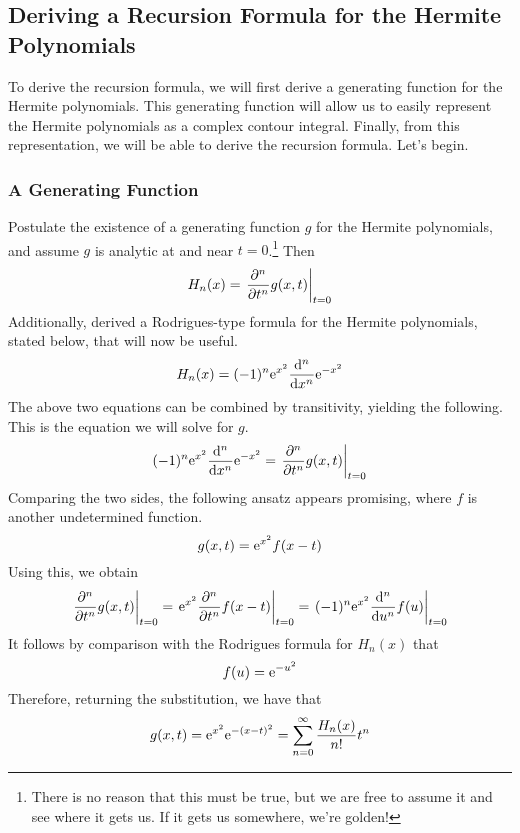 \documentclass[titlepage]{article}
\numberwithin{equation}{section}
\begin{document}
\subsection{Deriving a Recursion Formula for the Hermite Polynomials}
To derive the recursion formula, we will first derive a generating function for the Hermite polynomials. This generating function will allow us to easily represent the Hermite polynomials as a complex contour integral. Finally, from this representation, we will be able to derive the recursion formula. Let's begin.

\subsubsection{A Generating Function}
Postulate the existence of a generating function $g$ for the Hermite polynomials, and assume $g$ is analytic at and near $t=0$.\footnote{There is no reason that this must be true, but we are free to assume it and see where it gets us. If it gets us somewhere, we're golden!} Then
\begin{equation*}
    H_n(x) = \eval{\pdv[n]{t}g(x,t)}_{t=0}
\end{equation*}
Additionally, \textcite{bib:Seaborn} derived a Rodrigues-type formula for the Hermite polynomials, stated below, that will now be useful.
\begin{equation*}
    H_n(x) = (-1)^n\e[x^2]\dv[n]{x}\e[-x^2]
\end{equation*}
The above two equations can be combined by transitivity, yielding the following. This is the equation we will solve for $g$.
\begin{equation*}
    (-1)^n\e[x^2]\dv[n]{x}\e[-x^2] = \eval{\pdv[n]{t}g(x,t)}_{t=0}
\end{equation*}
Comparing the two sides, the following ansatz appears promising, where $f$ is another undetermined function.
\begin{equation*}
    g(x,t) = \e[x^2]f(x-t)
\end{equation*}
Using this, we obtain
\begin{equation*}
    \eval{\pdv[n]{t}g(x,t)}_{t=0} = \eval{\e[x^2]\pdv[n]{t}f(x-t)}_{t=0}
    = \eval{(-1)^n\e[x^2]\dv[n]{u}f(u)}_{t=0}
\end{equation*}
It follows by comparison with the Rodrigues formula for $H_n(x)$ that
\begin{equation*}
    f(u) = \e[-u^2]
\end{equation*}
Therefore, returning the substitution, we have that
\begin{equation*}
    g(x,t) = \e[x^2]\e[-(x-t)^2] = \sum_{n=0}^\infty\frac{H_n(x)}{n!}t^n
\end{equation*}
\end{document}
